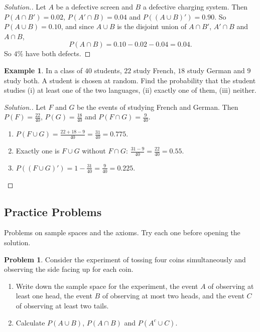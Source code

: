 \documentclass[12pt,a4paper]{report}
\theoremstyle{definition}
\newtheorem{example}[thm]{Example}
\theoremstyle{plain}
\theoremstyle{definition}
\newtheorem{problemx}{Problem}[section]
\newenvironment{problem}{\begin{problemx}}{\end{problemx}}
\newenvironment{solution}
  {\renewcommand{\qedsymbol}{}\begin{proof}[\textit{Solution}.]}
  {\end{proof}}
\begin{document}
\begin{solution}
Let $A$ be a defective screen and $B$ a defective charging system. Then
$P(A\cap B') = 0.02$, $P(A'\cap B) = 0.04$ and $P\left((A\cup B)'\right) = 0.90$. So
$P(A\cup B) = 0.10$, and since $A\cup B$ is the disjoint union of $A\cap B'$, $A'\cap B$
and $A\cap B$,
\[P(A\cap B) = 0.10 - 0.02 - 0.04 = 0.04 .\]
So $4\%$ have both defects.
\end{solution}

\begin{example}
\label{ex:inclusionexclusion}
In a class of $40$ students, $22$ study French, $18$ study German and $9$ study both.
A student is chosen at random. Find the probability that the student studies
(i) at least one of the two languages, (ii) exactly one of them, (iii) neither.
\end{example}

\begin{solution}
Let $F$ and $G$ be the events of studying French and German. Then $P(F) = \frac{22}{40}$,
$P(G) = \frac{18}{40}$ and $P(F\cap G) = \frac{9}{40}$.
\begin{enumerate}
\item[(i)] $P(F\cup G) = \frac{22 + 18 - 9}{40} = \frac{31}{40} = 0.775$.
\item[(ii)] Exactly one is $F\cup G$ without $F\cap G$:
$\frac{31 - 9}{40} = \frac{22}{40} = 0.55$.
\item[(iii)] $P\left((F\cup G)'\right) = 1 - \frac{31}{40} = \frac{9}{40} = 0.225$.
\end{enumerate}
\end{solution}

\subsection{Practice Problems}

Problems on sample spaces and the axioms. Try each one before opening the solution.

\begin{problem}
Consider the experiment of tossing four coins simultaneously and observing the side
facing up for each coin.
\begin{enumerate}
\item[(a).] Write down the sample space for the experiment, the event $A$ of observing
at least one head, the event $B$ of observing at most two heads, and the event $C$ of
observing at least two tails.
\item[(b).] Calculate $P(A\cup B)$, $P(A\cap B)$ and $P(A^c\cup C)$.
\end{enumerate}
\end{problem}
\end{document}
